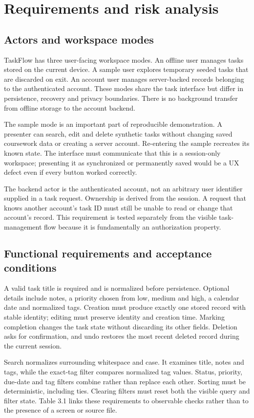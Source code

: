 \documentclass[12pt,a4paper,oneside]{report}
\begin{document}
\chapter{Requirements and risk analysis}
\section{Actors and workspace modes}
TaskFlow has three user-facing workspace modes. An offline user manages tasks stored on the current device. A sample user explores temporary seeded tasks that are discarded on exit. An account user manages server-backed records belonging to the authenticated account. These modes share the task interface but differ in persistence, recovery and privacy boundaries. There is no background transfer from offline storage to the account backend.

The sample mode is an important part of reproducible demonstration. A presenter can search, edit and delete synthetic tasks without changing saved coursework data or creating a server account. Re-entering the sample recreates its known state. The interface must communicate that this is a session-only workspace; presenting it as synchronized or permanently saved would be a UX defect even if every button worked correctly.

The backend actor is the authenticated account, not an arbitrary user identifier supplied in a task request. Ownership is derived from the session. A request that knows another account's task ID must still be unable to read or change that account's record. This requirement is tested separately from the visible task-management flow because it is fundamentally an authorization property.

\section{Functional requirements and acceptance conditions}
A valid task title is required and is normalized before persistence. Optional details include notes, a priority chosen from low, medium and high, a calendar date and normalized tags. Creation must produce exactly one stored record with stable identity; editing must preserve identity and creation time. Marking completion changes the task state without discarding its other fields. Deletion asks for confirmation, and undo restores the most recent deleted record during the current session.

Search normalizes surrounding whitespace and case. It examines title, notes and tags, while the exact-tag filter compares normalized tag values. Status, priority, due-date and tag filters combine rather than replace each other. Sorting must be deterministic, including ties. Clearing filters must reset both the visible query and filter state. Table 3.1 links these requirements to observable checks rather than to the presence of a screen or source file.
\end{document}
